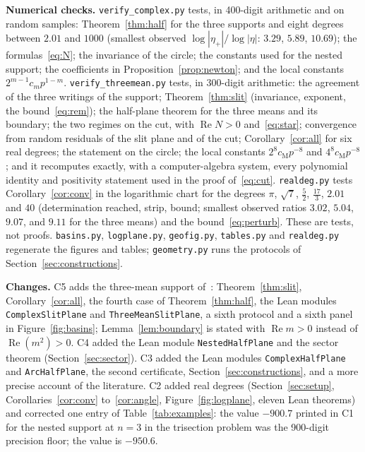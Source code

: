 \documentclass[10pt,a4paper]{article}
\theoremstyle{plain}
\theoremstyle{remark}
\numberwithin{equation}{section}
\DeclareMathOperator{\re}{Re}\DeclareMathOperator{\im}{Im}
\newcommand{\lean}[1]{\texttt{#1}}
\begin{document}
\textbf{Numerical checks.} \texttt{verify\_complex.py} tests, in 400-digit arithmetic and on random
samples: Theorem~\ref{thm:half} for the three supports and eight degrees between $2.01$ and $1000$
(smallest observed $\log|\eta_+|/\log|\eta|$: $3.29$, $5.89$, $10.69$); the
formulas~\eqref{eq:N}; the invariance of the circle; the constants used for the nested support; the
coefficients in Proposition~\ref{prop:newton}; and the local constants $2^{m-1}c_mp^{1-m}$.
\texttt{verify\_threemean.py} tests, in 300-digit arithmetic: the agreement of the three writings of
the support; Theorem~\ref{thm:slit} (invariance, exponent, the bound~\eqref{eq:rem}); the half-plane
theorem for the three means and its boundary; the two regimes on the cut, with $\re N>0$
and~\eqref{eq:star}; convergence from random residuals of the slit plane and of the cut;
Corollary~\ref{cor:all} for six real degrees; the statement on the circle; the local constants
$2^{8}c_{\mathrm M}p^{-8}$ and $4^{8}c_{\mathrm M}p^{-8}$; and it recomputes exactly, with a
computer-algebra system, every polynomial identity and positivity statement used in the proof
of~\eqref{eq:cut}. \texttt{realdeg.py} tests Corollary~\ref{cor:conv} in the logarithmic chart for the degrees $\pi$,
$\sqrt7$, $\frac52$, $\frac{17}3$, $2.01$ and $40$ (determination reached, strip, bound; smallest
observed ratios $3.02$, $5.04$, $9.07$, and $9.11$ for the three means) and the
bound~\eqref{eq:perturb}. These are tests, not
proofs. \texttt{basins.py}, \texttt{logplane.py}, \texttt{geofig.py}, \texttt{tables.py} and
\texttt{realdeg.py} regenerate the figures and tables; \texttt{geometry.py} runs the protocols of
Section~\ref{sec:constructions}.

\textbf{Changes.} C5 adds the three-mean support of~\cite{v29}: Theorem~\ref{thm:slit},
Corollary~\ref{cor:all}, the fourth case of Theorem~\ref{thm:half}, the Lean modules
\lean{ComplexSlitPlane} and \lean{ThreeMeanSlitPlane}, a sixth protocol and a sixth panel in
Figure~\ref{fig:basins}; Lemma~\ref{lem:boundary} is stated with $\re m>0$ instead of
$\re(m^{2})>0$. C4 added the Lean module \lean{NestedHalfPlane} and the sector theorem
(Section~\ref{sec:sector}). C3 added the Lean modules \lean{ComplexHalfPlane} and \lean{ArcHalfPlane}, the
second certificate, Section~\ref{sec:constructions}, and a more precise account of the literature.
C2 added real degrees (Section~\ref{sec:setup},
Corollaries~\ref{cor:conv} to~\ref{cor:angle}, Figure~\ref{fig:logplane}, eleven Lean theorems)
and corrected one entry of Table~\ref{tab:examples}: the value $-900.7$ printed in C1 for the
nested support at $n=3$ in the trisection problem was the 900-digit precision floor; the value is
$-950.6$.
\end{document}
